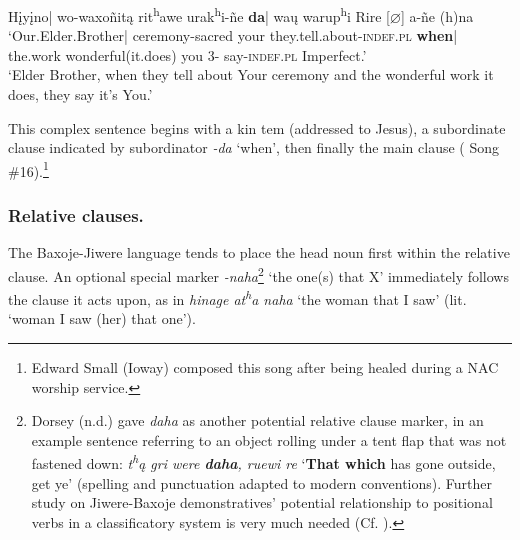 \documentclass[output=paper]{LSP/langsci}
\begin{document}
\ea \gll  H\k{i}y\k{i}no| wo-waxo\~nit\k{a}   rit\textsuperscript{h}awe  urak\textsuperscript{h}i-\~ne   \textbf{da}| wa\k{u}       warup\textsuperscript{h}i  Rire  [$\varnothing$] a-\~ne  (h)na \\ 
`Our.Elder.Brother| 	ceremony-sacred  your  they.tell.about-\textsc{indef.pl}   \textbf{when}| the.work wonderful(it.does)	  you  3- say-\textsc{indef.pl}         Imperfect.' \\
\trans `Elder Brother, when they tell about Your ceremony and the wonderful work it does, they say it's You.'
\z		

This complex sentence begins with a kin tem (addressed to Jesus), a subordinate clause indicated by subordinator \textit{-da} `when', then finally the main clause (\citealt{Davidson1997} Song \#16).\footnote{Edward Small (Ioway) composed this song after being healed during a NAC worship service.}  		

\subsubsection{Relative clauses.}  
The Baxoje-Jiwere language tends to place the head noun first within the relative clause.  An optional special marker \textit{-naha}\footnote{Dorsey (n.d.) gave \textit{daha} as another potential relative clause marker, in an example sentence referring to an object rolling under a tent flap that was not fastened down: \textit{t\textsuperscript{h}\k{a} gri were \textbf{daha}, ruewi re} `\textbf{That which} has gone outside, get ye' (spelling and punctuation adapted to modern conventions). Further study on Jiwere-Baxoje demonstratives' potential relationship to positional verbs in a classificatory system is very much needed (Cf. \citealt[3]{Rankin2005}).}  `the one(s) that X' immediately follows the clause it acts upon, as in \textit{hinage at\textsuperscript{h}a naha} `the woman that I saw' (lit. `woman I saw (her) that one').   
\end{document}
